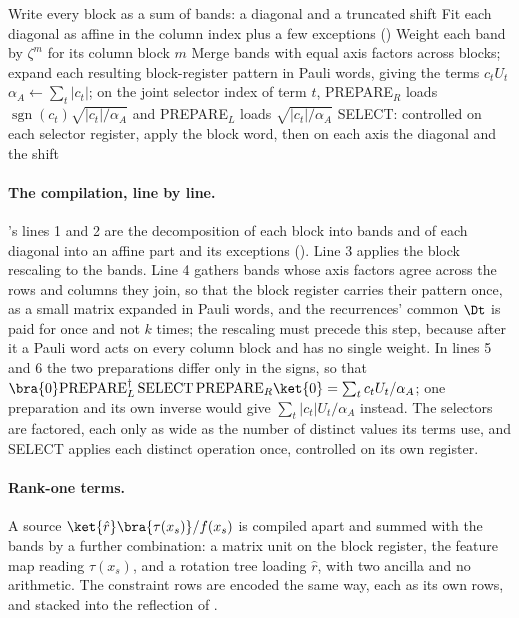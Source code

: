 \begin{algorithm}[htbp]
    \caption{Compiling the rows of $\Adesc$ into two preparations and one SELECT.}
    \label{alg:ir-to-lcu}
    Write every block as a sum of bands: a diagonal and a truncated shift\;
    Fit each diagonal as affine in the column index plus a few exceptions ()\;
    Weight each band by $\zeta^{m}$ for its column block $m$\;
    Merge bands with equal axis factors across blocks; expand each resulting block-register pattern in Pauli words, giving the terms $c_tU_t$\;
    $\alpha_A \leftarrow \sum_{t} |c_t|$; on the joint selector index of term $t$, PREPARE$_R$ loads $\operatorname{sgn}(c_t)\sqrt{|c_t|/\alpha_A}$ and PREPARE$_L$ loads $\sqrt{|c_t|/\alpha_A}$\;
    SELECT: controlled on each selector register, apply the block word, then on each axis the diagonal and the shift\;
    \;
\end{algorithm}

\paragraph{The compilation, line by line.} 's lines 1 and 2 are the decomposition of each block into bands and of each diagonal into an affine part and its exceptions (). Line 3 applies the block rescaling to the bands. Line 4 gathers bands whose axis factors agree across the rows and columns they join, so that the block register carries their pattern once, as a small matrix expanded in Pauli words, and the recurrences' common $\Dt$ is paid for once and not $k$ times; the rescaling must precede this step, because after it a Pauli word acts on every column block and has no single weight. In lines 5 and 6 the two preparations differ only in the signs, so that $\bra{0}\mathrm{PREPARE}_L^\dagger\,\mathrm{SELECT}\,\mathrm{PREPARE}_R\ket{0}=\sum_tc_tU_t/\alpha_A$; one preparation and its own inverse would give $\sum_t|c_t|U_t/\alpha_A$ instead. The selectors are factored, each only as wide as the number of distinct values its terms use, and SELECT applies each distinct operation once, controlled on its own register.

\paragraph{Rank-one terms.} A source $\ket{\hat r}\bra{\tau(x_s)}/f(x_s)$ is compiled apart and summed with the bands by a further combination: a matrix unit on the block register, the feature map reading $\tau(x_s)$, and a rotation tree loading $\hat r$, with two ancilla and no arithmetic. The constraint rows are encoded the same way, each as its own rows, and stacked into the reflection of .

